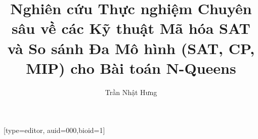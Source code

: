 \documentclass[a4paper,fleqn]{cas-sc}
\begin{document}
\let\WriteBookmarks\relax
\def\floatpagepagefraction{1}
\def\textpagefraction{.001}


\title [mode = title]{Nghiên cứu Thực nghiệm Chuyên sâu về các Kỹ thuật Mã hóa SAT và So sánh Đa Mô hình (SAT, CP, MIP) cho Bài toán N-Queens}

\author[1]{Trần Nhật Hưng}[type=editor,
                        auid=000,bioid=1]
\cormark[1]
\address[1]{Khoa Công nghệ Thông tin, Trường Đại học Công nghệ, Đại học Quốc gia Hà Nội, 144 Xuân Thủy, Cầu Giấy, Hà Nội, Việt Nam}

\end{document}
